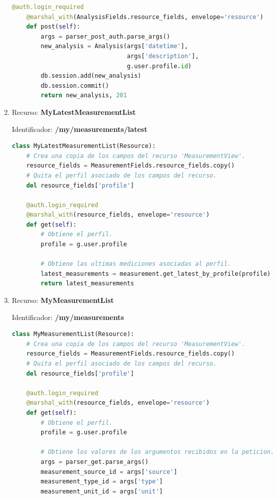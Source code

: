 \begin{enumerate}
\begin{lstlisting}[language=Python]
    @auth.login_required
    @marshal_with(AnalysisFields.resource_fields, envelope='resource')
    def post(self):
        args = parser_post_auth.parse_args()
        new_analysis = Analysis(args['datetime'],
                                args['description'],
                                g.user.profile.id)
        db.session.add(new_analysis)
        db.session.commit()
        return new_analysis, 201
\end{lstlisting}

\item Recurso: \textbf{MyLatestMeasurementList}

Identificador: \textbf{/my/measurements/latest}

\begin{lstlisting}[language=Python]
class MyLatestMeasurementList(Resource):
    # Crea una copia de los campos del recurso 'MeasurementView'.
    resource_fields = MeasurementFields.resource_fields.copy()
    # Quita el perfil asociado de los campos del recurso.
    del resource_fields['profile']

    @auth.login_required
    @marshal_with(resource_fields, envelope='resource')
    def get(self):
        # Obtiene el perfil.
        profile = g.user.profile

        # Obtiene las ultimas mediciones asociadas al perfil.
        latest_measurements = measurement.get_latest_by_profile(profile)
        return latest_measurements
\end{lstlisting}

\item Recurso: \textbf{MyMeasurementList}

Identificador: \textbf{/my/measurements}

\begin{lstlisting}[language=Python]
class MyMeasurementList(Resource):
    # Crea una copia de los campos del recurso 'MeasurementView'.
    resource_fields = MeasurementFields.resource_fields.copy()
    # Quita el perfil asociado de los campos del recurso.
    del resource_fields['profile']

    @auth.login_required
    @marshal_with(resource_fields, envelope='resource')
    def get(self):
        # Obtiene el perfil.
        profile = g.user.profile

        # Obtiene los valores de los argumentos recibidos en la peticion.
        args = parser_get.parse_args()
        measurement_source_id = args['source']
        measurement_type_id = args['type']
        measurement_unit_id = args['unit']


\end{lstlisting}
\end{enumerate}

